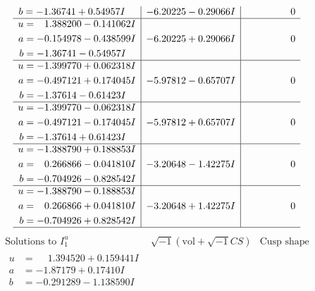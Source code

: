 \documentclass[1p]{elsarticle_modified}
\theoremstyle{definition}
\newcommand{\I}{\sqrt{-1}}
\begin{document}
$$\begin{array}{c|c|c}
\begin{aligned}
b &= -1.36741 + 0.54957 I\end{aligned}
 & -6.20225 - 0.29066 I & \phantom{-0.000000 } 0 \\ \hline\begin{aligned}
u &= \phantom{-}1.388200 - 0.141062 I \\
a &= -0.154978 - 0.438599 I \\
b &= -1.36741 - 0.54957 I\end{aligned}
 & -6.20225 + 0.29066 I & \phantom{-0.000000 } 0 \\ \hline\begin{aligned}
u &= -1.399770 + 0.062318 I \\
a &= -0.497121 + 0.174045 I \\
b &= -1.37614 - 0.61423 I\end{aligned}
 & -5.97812 - 0.65707 I & \phantom{-0.000000 } 0 \\ \hline\begin{aligned}
u &= -1.399770 - 0.062318 I \\
a &= -0.497121 - 0.174045 I \\
b &= -1.37614 + 0.61423 I\end{aligned}
 & -5.97812 + 0.65707 I & \phantom{-0.000000 } 0 \\ \hline\begin{aligned}
u &= -1.388790 + 0.188853 I \\
a &= \phantom{-}0.266866 - 0.041810 I \\
b &= -0.704926 - 0.828542 I\end{aligned}
 & -3.20648 - 1.42275 I & \phantom{-0.000000 } 0 \\ \hline\begin{aligned}
u &= -1.388790 - 0.188853 I \\
a &= \phantom{-}0.266866 + 0.041810 I \\
b &= -0.704926 + 0.828542 I\end{aligned}
 & -3.20648 + 1.42275 I & \phantom{-0.000000 } 0\\
 \hline 
 \end{array}$$\newpage$$\begin{array}{c|c|c}  
\text{Solutions to }I^u_{1}& \I (\text{vol} + \sqrt{-1}CS) & \text{Cusp shape}\\
 \hline 
\begin{aligned}
u &= \phantom{-}1.394520 + 0.159441 I \\
a &= -1.87179 + 0.17410 I \\
b &= -0.291289 - 1.138590 I\end{aligned}

\end{array}$$
\end{document}
